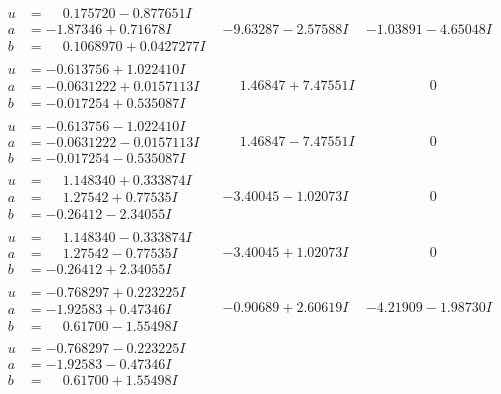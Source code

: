 \documentclass[1p]{elsarticle_modified}
\theoremstyle{definition}
\begin{document}
$$\begin{array}{c|c|c}
 \hline 
\begin{aligned}
u &= \phantom{-}0.175720 - 0.877651 I \\
a &= -1.87346 + 0.71678 I \\
b &= \phantom{-}0.1068970 + 0.0427277 I\end{aligned}
 & -9.63287 - 2.57588 I & -1.03891 - 4.65048 I \\ \hline\begin{aligned}
u &= -0.613756 + 1.022410 I \\
a &= -0.0631222 + 0.0157113 I \\
b &= -0.017254 + 0.535087 I\end{aligned}
 & \phantom{-}1.46847 + 7.47551 I & \phantom{-0.000000 } 0 \\ \hline\begin{aligned}
u &= -0.613756 - 1.022410 I \\
a &= -0.0631222 - 0.0157113 I \\
b &= -0.017254 - 0.535087 I\end{aligned}
 & \phantom{-}1.46847 - 7.47551 I & \phantom{-0.000000 } 0 \\ \hline\begin{aligned}
u &= \phantom{-}1.148340 + 0.333874 I \\
a &= \phantom{-}1.27542 + 0.77535 I \\
b &= -0.26412 - 2.34055 I\end{aligned}
 & -3.40045 - 1.02073 I & \phantom{-0.000000 } 0 \\ \hline\begin{aligned}
u &= \phantom{-}1.148340 - 0.333874 I \\
a &= \phantom{-}1.27542 - 0.77535 I \\
b &= -0.26412 + 2.34055 I\end{aligned}
 & -3.40045 + 1.02073 I & \phantom{-0.000000 } 0 \\ \hline\begin{aligned}
u &= -0.768297 + 0.223225 I \\
a &= -1.92583 + 0.47346 I \\
b &= \phantom{-}0.61700 - 1.55498 I\end{aligned}
 & -0.90689 + 2.60619 I & -4.21909 - 1.98730 I \\ \hline\begin{aligned}
u &= -0.768297 - 0.223225 I \\
a &= -1.92583 - 0.47346 I \\
b &= \phantom{-}0.61700 + 1.55498 I\end{aligned}

\end{array}$$
\end{document}

